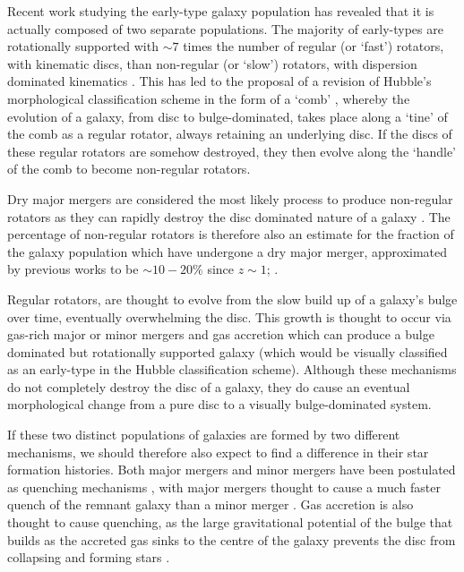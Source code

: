 \documentclass[useAMS,usenatbib]{mn2e}
\begin{document}
Recent work studying the early-type galaxy population has revealed that it is actually composed of two separate populations. The majority of early-types are rotationally supported \citep{emsellem11} with $\sim7$ times the number of regular (or `fast') rotators, with kinematic discs, than non-regular (or `slow') rotators, with dispersion dominated kinematics \citep{cappellari07, emsellem07}.  This has led to the proposal of a revision of Hubble's morphological classification scheme in the form of a `comb' \citep{cappellari16}, whereby the evolution of a galaxy, from  disc to bulge-dominated, takes place along a `tine' of the comb as a regular rotator, always retaining an underlying disc. If the discs of these regular rotators are somehow destroyed, they then evolve along the `handle' of the comb to become non-regular rotators. 

Dry major mergers are considered the most likely process to produce non-regular rotators \citep{duc11, naab14} as they can rapidly destroy the disc dominated nature of a galaxy \citep{toomre72}. The percentage of non-regular rotators is therefore also an estimate for the fraction of the galaxy population which have undergone a dry major merger, approximated by previous works to be $\sim10-20\%$ since $z\sim1$; \citep[][]{khochfar09}.

Regular rotators, are thought to evolve from the slow build up of a galaxy's bulge over time, eventually overwhelming the disc. This growth is thought to occur via gas-rich major or minor mergers \citep{duc11} and gas accretion \citep{cappellari13} which can produce a bulge dominated but rotationally supported galaxy (which would be visually classified as an early-type in the Hubble classification scheme). Although these mechanisms do not completely destroy the disc of a galaxy, they do cause an eventual morphological change from a pure disc to a visually bulge-dominated system.

If these two distinct populations of galaxies are formed by two different mechanisms, we should therefore also expect to find a difference in their star formation histories. Both major mergers and minor mergers have been postulated as quenching mechanisms \citep{mihos94, hopkins06d, hopkins08b, hopkins08a, snyder11, hayward14}, with major mergers thought to cause a much faster quench of the remnant galaxy than a minor merger \citep{lotz08b, lotz11}. Gas accretion is also thought to cause quenching, as the large gravitational potential of the bulge that builds as the accreted gas sinks to the centre of the galaxy prevents the disc from collapsing and forming stars \citep{cheung12, fang13}.
\end{document}
